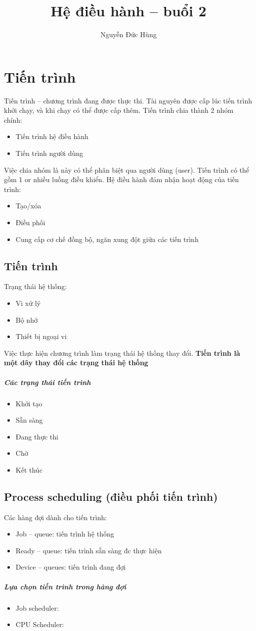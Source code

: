 \documentclass[11pt]{book}
\title{Hệ điều hành -- buổi 2}
\author{Nguyễn Đức Hùng}
\begin{document}

\chapter{Tiến trình}
Tiến trình -- chương trình đang được thực thi. Tài nguyên được cấp lúc tiến trình khởi chạy, và khi chạy có thể được cấp thêm.
Tiến trình chia thành 2 nhóm chính:
\begin{itemize}
\item Tiến trình hệ điều hành
\item Tiến trình người dùng
\end{itemize}
Việc chia nhóm là này có thể phân biệt qua người dùng (user). Tiến trình có thể gồm 1 or nhiều luồng điều khiển. Hệ điều hành đảm nhận hoạt động của tiến trình:
\begin{itemize}
\item Tạo/xóa
\item Điều phối
\item Cung cấp cơ chế đồng bộ, ngăn xung đột giữa các tiến trình
\end{itemize}
\section{Tiến trình}
Trạng thái hệ thống:
\begin{itemize}
\item Vi xử lý
\item Bộ nhớ
\item Thiết bị ngoại vi
\end{itemize}
Việc thực hiện chương trình làm trạng thái hệ thống thay đổi.
\textbf{Tiến trình là một dãy thay đổi các trạng thái hệ thống}
\paragraph{Các trạng thái tiến trình}
\begin{itemize}
\item Khởi tạo
\item Sẵn sàng
\item Đang thực thi
\item Chờ
\item Kết thúc
\end{itemize}
\section{Process scheduling (điều phối tiến trình)}
Các hàng đợi dành cho tiến trình:
\begin{itemize}
\item Job -- queue: tiến trình hệ thống
\item Ready -- queue: tiến trình sẵn sàng đc thực hiện
\item Device -- queues: tiến trình đang đợi
\end{itemize}
\paragraph{Lựa chọn tiến trình trong hàng đợi}
\begin{itemize}
\item Job scheduler: 
\item CPU Scheduler: 
\end{itemize}
\end{document}
